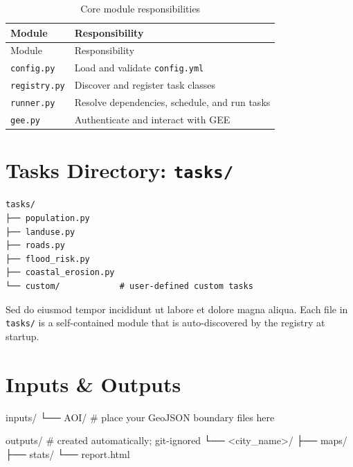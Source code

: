 \documentclass[
  letterpaper,
  DIV=11,
  numbers=noendperiod]{scrreprt}
\newenvironment{Shaded}{\begin{snugshade}}{\end{snugshade}}
\newcommand{\CommentTok}[1]{\textcolor[rgb]{0.37,0.37,0.37}{#1}}
\newcommand{\ExtensionTok}[1]{\textcolor[rgb]{0.00,0.23,0.31}{#1}}
\newcommand{\NormalTok}[1]{\textcolor[rgb]{0.00,0.23,0.31}{#1}}
\newcommand{\OperatorTok}[1]{\textcolor[rgb]{0.37,0.37,0.37}{#1}}
\begin{document}
\begin{longtable}[]{@{}ll@{}}
\caption{Core module responsibilities}\label{tbl-modules}\tabularnewline
\toprule\noalign{}
Module & Responsibility \\
\midrule\noalign{}
\endfirsthead
\toprule\noalign{}
Module & Responsibility \\
\midrule\noalign{}
\endhead
\bottomrule\noalign{}
\endlastfoot
\texttt{config.py} & Load and validate \texttt{config.yml} \\
\texttt{registry.py} & Discover and register task classes \\
\texttt{runner.py} & Resolve dependencies, schedule, and run tasks \\
\texttt{gee.py} & Authenticate and interact with GEE \\
\end{longtable}

\section{\texorpdfstring{Tasks Directory:
\texttt{tasks/}}{Tasks Directory: tasks/}}\label{tasks-directory-tasks}

\begin{verbatim}
tasks/
├── population.py
├── landuse.py
├── roads.py
├── flood_risk.py
├── coastal_erosion.py
└── custom/            # user-defined custom tasks
\end{verbatim}

Sed do eiusmod tempor incididunt ut labore et dolore magna aliqua. Each
file in \texttt{tasks/} is a self-contained module that is
auto-discovered by the registry at startup.

\section{Inputs \& Outputs}\label{inputs-outputs}

\begin{Shaded}
\begin{Highlighting}[]
\ExtensionTok{inputs/}
\ExtensionTok{└──}\NormalTok{ AOI/               }\CommentTok{\# place your GeoJSON boundary files here}

\ExtensionTok{outputs/}               \CommentTok{\# created automatically; git{-}ignored}
\ExtensionTok{└──} \OperatorTok{\textless{}}\NormalTok{city\_name}\OperatorTok{\textgreater{}}\NormalTok{/}
    \ExtensionTok{├──}\NormalTok{ maps/}
    \ExtensionTok{├──}\NormalTok{ stats/}
    \ExtensionTok{└──}\NormalTok{ report.html}
\end{Highlighting}
\end{Shaded}
\end{document}
